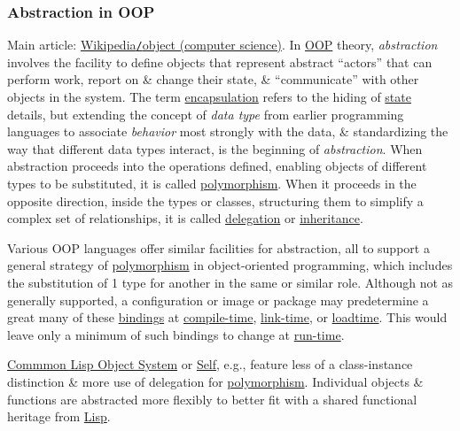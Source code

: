 \documentclass{article}
\begin{document}
\subsubsection{Abstraction in OOP}
Main article: \href{https://en.wikipedia.org/wiki/Object_(computer_science)}{Wikipedia{\tt/}object (computer science)}. In \href{https://en.wikipedia.org/wiki/Object-oriented_programming}{OOP} theory, {\it abstraction} involves the facility to define objects that represent abstract ``actors'' that can perform work, report on \& change their state, \& ``communicate'' with other objects in the system. The term \href{https://en.wikipedia.org/wiki/Encapsulation_(object-oriented_programming)}{encapsulation} refers to the hiding of \href{https://en.wikipedia.org/wiki/State_(computer_science)}{state} details, but extending the concept of {\it data type} from earlier programming languages to associate {\it behavior} most strongly with the data, \& standardizing the way that different data types interact, is the beginning of {\it abstraction}. When abstraction proceeds into the operations defined, enabling objects of different types to be substituted, it is called \href{https://en.wikipedia.org/wiki/Polymorphism_(computer_science)}{polymorphism}. When it proceeds in the opposite direction, inside the types or classes, structuring them to simplify a complex set of relationships, it is called \href{https://en.wikipedia.org/wiki/Delegation_(object-oriented_programming)}{delegation} or \href{https://en.wikipedia.org/wiki/Inheritance_(object-oriented_programming)}{inheritance}.

Various OOP languages offer similar facilities for abstraction, all to support a general strategy of \href{https://en.wikipedia.org/wiki/Polymorphism_(computer_science)}{polymorphism} in object-oriented programming, which includes the substitution of 1 type for another in the same or similar role. Although not as generally supported, a configuration or image or package may predetermine a great many of these \href{https://en.wikipedia.org/wiki/Name_binding}{bindings} at \href{https://en.wikipedia.org/wiki/Compile-time}{compile-time}, \href{https://en.wikipedia.org/wiki/Link-time}{link-time}, or \href{https://en.wikipedia.org/wiki/Loadtime}{loadtime}. This would leave only a minimum of such bindings to change at \href{https://en.wikipedia.org/wiki/Run_time_(program_lifecycle_phase)}{run-time}.

\href{https://en.wikipedia.org/wiki/Common_Lisp_Object_System}{Commmon Lisp Object System} or \href{https://en.wikipedia.org/wiki/Self_(programming_language)}{Self}, e.g., feature less of a class-instance distinction \& more use of delegation for \href{https://en.wikipedia.org/wiki/Polymorphism_in_object-oriented_programming}{polymorphism}. Individual objects \& functions are abstracted more flexibly to better fit with a shared functional heritage from \href{https://en.wikipedia.org/wiki/Lisp_programming_language}{Lisp}.
\end{document}

